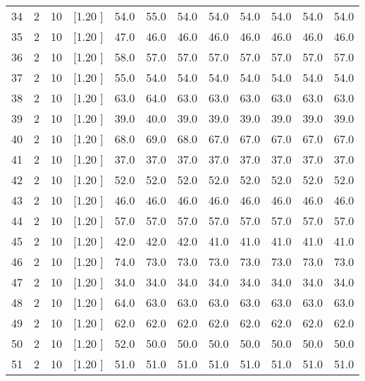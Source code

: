 \documentclass[12pt,a4paper]{article}
\begin{document}
\begin{center}
{\begin{tabular}{r r r r r r r r r r r r}
  34&  2& 10&[1.20      ]&    54.0&    55.0&    54.0&    54.0&    54.0&    54.0&    54.0&    54.0\\[-0.02in]
  35&  2& 10&[1.20      ]&    47.0&    46.0&    46.0&    46.0&    46.0&    46.0&    46.0&    46.0\\[-0.02in]
  36&  2& 10&[1.20      ]&    58.0&    57.0&    57.0&    57.0&    57.0&    57.0&    57.0&    57.0\\[-0.02in]
  37&  2& 10&[1.20      ]&    55.0&    54.0&    54.0&    54.0&    54.0&    54.0&    54.0&    54.0\\[-0.02in]
  38&  2& 10&[1.20      ]&    63.0&    64.0&    63.0&    63.0&    63.0&    63.0&    63.0&    63.0\\[-0.02in]
  39&  2& 10&[1.20      ]&    39.0&    40.0&    39.0&    39.0&    39.0&    39.0&    39.0&    39.0\\[-0.02in]
  40&  2& 10&[1.20      ]&    68.0&    69.0&    68.0&    67.0&    67.0&    67.0&    67.0&    67.0\\[-0.02in]
  41&  2& 10&[1.20      ]&    37.0&    37.0&    37.0&    37.0&    37.0&    37.0&    37.0&    37.0\\[-0.02in]
  42&  2& 10&[1.20      ]&    52.0&    52.0&    52.0&    52.0&    52.0&    52.0&    52.0&    52.0\\[-0.02in]
  43&  2& 10&[1.20      ]&    46.0&    46.0&    46.0&    46.0&    46.0&    46.0&    46.0&    46.0\\[-0.02in]
  44&  2& 10&[1.20      ]&    57.0&    57.0&    57.0&    57.0&    57.0&    57.0&    57.0&    57.0\\[-0.02in]
  45&  2& 10&[1.20      ]&    42.0&    42.0&    42.0&    41.0&    41.0&    41.0&    41.0&    41.0\\[-0.02in]
  46&  2& 10&[1.20      ]&    74.0&    73.0&    73.0&    73.0&    73.0&    73.0&    73.0&    73.0\\[-0.02in]
  47&  2& 10&[1.20      ]&    34.0&    34.0&    34.0&    34.0&    34.0&    34.0&    34.0&    34.0\\[-0.02in]
  48&  2& 10&[1.20      ]&    64.0&    63.0&    63.0&    63.0&    63.0&    63.0&    63.0&    63.0\\[-0.02in]
  49&  2& 10&[1.20      ]&    62.0&    62.0&    62.0&    62.0&    62.0&    62.0&    62.0&    62.0\\[-0.02in]
  50&  2& 10&[1.20      ]&    52.0&    50.0&    50.0&    50.0&    50.0&    50.0&    50.0&    50.0\\[-0.02in]
  51&  2& 10&[1.20      ]&    51.0&    51.0&    51.0&    51.0&    51.0&    51.0&    51.0&    51.0\\[-0.02in]

\end{tabular}}
\end{center}
\end{document}
